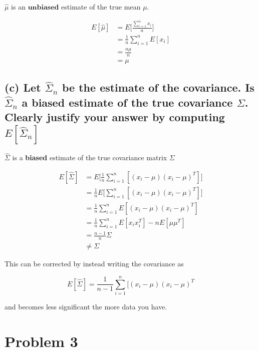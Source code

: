 \documentclass{article}
\begin{document}
$\hat\mu$ is an $\textbf{unbiased}$ estimate of the true mean $\mu$.

\begin{equation}
  \begin{aligned}
E[\hat\mu]  &= E\Bigg[ \frac{ \sum\limits_{i = 1}^n x_i}{n} \Bigg] \\
&= \frac{1}{n} \sum\limits_{i = 1}^nE[x_i] \\
&= \frac{n\mu}{n} \\
&= \mu
  \end{aligned}
\end{equation}


\subsection{(c) Let $\hat\Sigma_n$ be the estimate of the covariance. Is $\hat\Sigma_n$ a biased estimate of the true covariance $\Sigma$.  Clearly justify your answer by computing $E[\hat\Sigma_n]$}

\noindent $\hat\Sigma$ is a \textbf{biased} estimate of the true covariance matrix $\Sigma$

\begin{equation}
  \begin{aligned}
E[\hat\Sigma]  &= E\Bigg[ \frac{1}{n} \sum\limits_{i = 1}^n [ (x_i - \mu)(x_i - \mu)^T] \Bigg] \\
&= \frac{1}{n} E\Bigg[ \sum\limits_{i = 1}^n [ (x_i - \mu)(x_i - \mu)^T] \Bigg] \\
&= \frac{1}{n} \sum\limits_{i = 1}^n E [ (x_i - \mu)(x_i - \mu)^T]  \\
&= \frac{1}{n} \sum\limits_{i = 1}^n E [ x_i x_i^T ] - nE[ \mu\mu^T]  \\
&= \frac{n-1}{n} \Sigma \\
&\neq \Sigma
  \end{aligned}
\end{equation}

\noindent This can be corrected by instead writing the covariance as

\begin{equation}
E[\hat\Sigma] = \frac{1}{n - 1} \sum\limits_{i = 1}^n [ (x_i - \mu)(x_i - \mu)^T
\end{equation}

\noindent and becomes less significant the more data you have.


\section{Problem 3}
\end{document}
